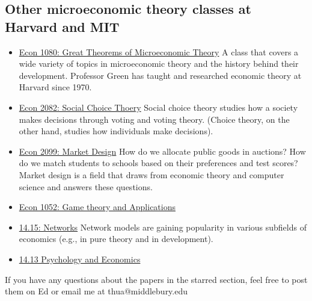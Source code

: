 \subsection*{Other microeconomic theory classes at Harvard and MIT}
\begin{itemize}
    \item \href{https://canvas.harvard.edu/courses/91911}{Econ 1080: Great Theorems of Microeconomic Theory} A class that covers a wide variety of topics in microeconomic theory and the history behind their development. Professor Green has taught and researched economic theory at Harvard since 1970.
    \item \href{https://canvas.harvard.edu/courses/73987/assignments/syllabus}{Econ 2082: Social Choice Thoery} Social choice theory studies how a society makes decisions through voting and voting theory. (Choice theory, on the other hand, studies how individuals make decisions).
    \item \href{https://canvas.harvard.edu/courses/60607}{Econ 2099: Market Design} How do we allocate public goods in auctions? How do we match students to schools based on their preferences and test scores? Market design is a field that draws from economic theory and computer science and answers these questions. 
    \item \href{https://canvas.harvard.edu/courses/85061}{Econ 1052: Game theory and Applications}
    \item \href{https://ocw.mit.edu/courses/14-15j-networks-spring-2018/}{14.15: Networks} Network models are gaining popularity in various subfields of economics (e.g., \citet{localbayesian} in pure theory and \citet{gossip} in development).
    \item \href{https://ocw.mit.edu/courses/14-13-psychology-and-economics-spring-2020/}{14.13 Psychology and Economics}
\end{itemize}

If you have any questions about the papers in the starred section, feel free to post them on Ed or email me at thua@middlebury.edu

